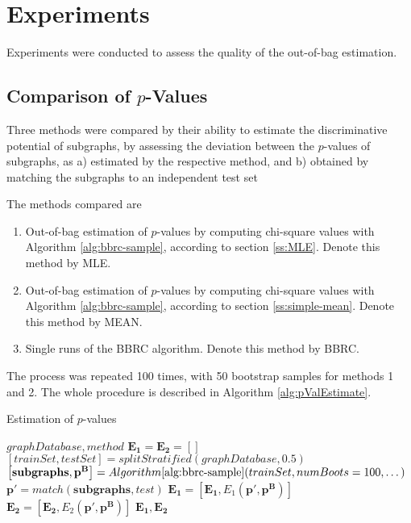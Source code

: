 \documentclass{article}
\begin{document}

\section{Experiments}
Experiments were conducted to assess the quality of the out-of-bag estimation.

\subsection{Comparison of $p$-Values}
Three methods were compared by their ability to estimate the discriminative potential of subgraphs, by assessing the deviation between the $p$-values of subgraphs, as
a) estimated by the respective method, and 
b) obtained by matching the subgraphs to an independent test set

The methods compared are

\begin{enumerate}
  \item{Out-of-bag estimation of $p$-values by computing chi-square values with Algorithm \ref{alg:bbrc-sample}, according to section \ref{ss:MLE}. Denote this method by MLE.}
  \item{Out-of-bag estimation of $p$-values by computing chi-square values with Algorithm \ref{alg:bbrc-sample}, according to section \ref{ss:simple-mean}. Denote this method by MEAN.}
  \item{Single runs of the BBRC algorithm. Denote this method by BBRC.} 
\end{enumerate}

The process was repeated 100 times, with 50 bootstrap samples for methods 1 and 2. The whole procedure is described in Algorithm \ref{alg:pValEstimate}.
\begin{algorithm}
  \caption{Estimation of $p$-values}
  \label{alg:pValEstimate}
\begin{algorithmic}[1]
  \Require $graphDatabase, method$ 
  \State $\mathbf{E_1}=\mathbf{E_2}=\left[ \right]$
    \State $[trainSet, testSet] = splitStratified(graphDatabase,0.5)$ 
    \State $\left[ \mathbf{subgraphs}, \mathbf{p^B} \right] = Algorithm \ref{alg:bbrc-sample}(trainSet,numBoots=100,\dots)$ 
    \State $\mathbf{p'} = match(\mathbf{subgraphs}, test)$ 
    \State $ \mathbf{E_1} = \left[ \mathbf{E_1}, E_1(\mathbf{p'}, \mathbf{p^B}) \right]$
    \State $ \mathbf{E_2} = \left[ \mathbf{E_2}, E_2(\mathbf{p'}, \mathbf{p^B}) \right]$
  \EndFor
  \Ensure $\mathbf{E_1},\mathbf{E_2}$
\end{algorithmic}
\end{algorithm}
\end{document}

